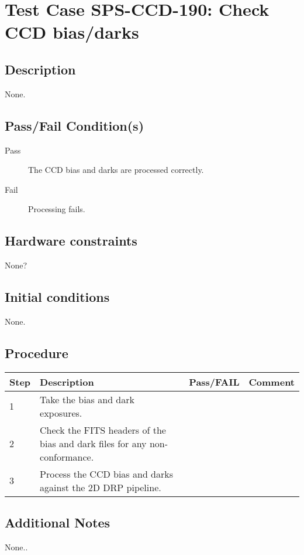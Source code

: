 \section{Test Case SPS-CCD-190: Check CCD bias/darks}

\subsection{Description}

None.

\subsection{Pass/Fail Condition(s)}

\begin{description}
\item [Pass] The CCD bias and darks are processed correctly.
\item [Fail] Processing fails.
\end{description}

\subsection{Hardware constraints}

None?

\subsection{Initial conditions}

None.

\subsection{Procedure}

\begin{table}[H]
    \begin{tabular}{|l| p{5cm} |l| p{5cm} |}
    \hline
    {\bf Step} & {\bf Description} & {\bf Pass/FAIL} & {\bf Comment}  \\ \hline
    1 & Take the bias and dark exposures. &  &  \\ \hline
    2 & Check the FITS headers of the bias and dark files for any non-conformance. &  &  \\ \hline
    3 & Process the CCD bias and darks against the 2D DRP pipeline. &  &  \\ \hline
    \end{tabular}
\end{table}

\subsection{Additional Notes}

None..
